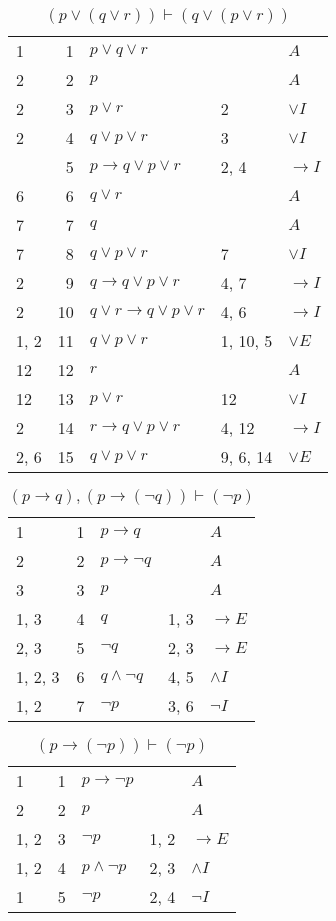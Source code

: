 \documentclass{article}
\begin{document}
\begin{table}[htbp]\caption*{$(p∨(q∨r)) ⊢ (q∨(p∨r))$}\centering\begin{tabular}{lrlll}
		{1} & 1 & $p∨q∨r$ & {} & $A$ \\
		{2} & 2 & $p$ & {} & $A$ \\
		{2} & 3 & $p∨r$ & {2} & $∨I$ \\
		{2} & 4 & $q∨p∨r$ & {3} & $∨I$ \\
		{} & 5 & $p→q∨p∨r$ & {2, 4} & $→I$ \\
		{6} & 6 & $q∨r$ & {} & $A$ \\
		{7} & 7 & $q$ & {} & $A$ \\
		{7} & 8 & $q∨p∨r$ & {7} & $∨I$ \\
		{2} & 9 & $q→q∨p∨r$ & {4, 7} & $→I$ \\
		{2} & 10 & $q∨r→q∨p∨r$ & {4, 6} & $→I$ \\
		{1, 2} & 11 & $q∨p∨r$ & {1, 10, 5} & $∨E$ \\
		{12} & 12 & $r$ & {} & $A$ \\
		{12} & 13 & $p∨r$ & {12} & $∨I$ \\
		{2} & 14 & $r→q∨p∨r$ & {4, 12} & $→I$ \\
		{2, 6} & 15 & $q∨p∨r$ & {9, 6, 14} & $∨E$ \\
	\end{tabular}
\end{table}
\begin{table}[htbp]\caption*{$(p→q),(p→(¬q)) ⊢ (¬p)$}\centering\begin{tabular}{lrlll}
		{1} & 1 & $p→q$ & {} & $A$ \\
		{2} & 2 & $p→ ¬q$ & {} & $A$ \\
		{3} & 3 & $p$ & {} & $A$ \\
		{1, 3} & 4 & $q$ & {1, 3} & $→E$ \\
		{2, 3} & 5 & $¬q$ & {2, 3} & $→E$ \\
		{1, 2, 3} & 6 & $q∧ ¬q$ & {4, 5} & $∧I$ \\
		{1, 2} & 7 & $¬p$ & {3, 6} & $¬I$ \\
	\end{tabular}
\end{table}
\begin{table}[htbp]\caption*{$(p→(¬p)) ⊢ (¬p)$}\centering\begin{tabular}{lrlll}
		{1} & 1 & $p→ ¬p$ & {} & $A$ \\
		{2} & 2 & $p$ & {} & $A$ \\
		{1, 2} & 3 & $¬p$ & {1, 2} & $→E$ \\
		{1, 2} & 4 & $p∧ ¬p$ & {2, 3} & $∧I$ \\
		{1} & 5 & $¬p$ & {2, 4} & $¬I$ \\
	\end{tabular}
\end{table}
\end{document}
